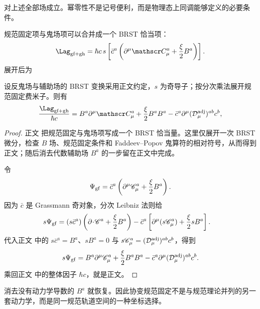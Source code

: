 对上述全部场成立。幂零性不是记号便利，而是物理态上同调能够定义的必要条件。

规范固定项与鬼场项可以合并成一个 BRST 恰当项：
\begin{equation}
 {
 \Lag_{\rm gf+gh}
 =\hbar c\,s\left[
 \bar c^a\left(\partial^\mu\mathscr C_\mu^a+\frac\xi2B^a\right)
 \right].}
 \label{eq:brst-exact-gf-dp11}
\end{equation}
展开后为


\begin{proposition}
设反鬼场与辅助场的 BRST 变换采用正文约定，$s$ 为奇导子；按分次乘法展开规范固定费米子。则有
\begin{equation}
 \frac{\Lag_{\rm gf+gh}}{\hbar c}
 =B^a\partial^\mu\mathscr C_\mu^a
 +\frac\xi2B^aB^a
 -\bar c^a\partial^\mu(\mathcal D_\mu^{\rm adj})^{ab}c^b,
\label{eq:brst-gf-expanded-dp11}
\end{equation}
\end{proposition}
\begin{proof}
正文 把规范固定与鬼场项写成一个 BRST 恰当量。这里仅展开一次 BRST 微分，检查 $B$ 场、规范固定条件和 Faddeev--Popov 鬼算符的相对符号，从而得到正文；随后消去代数辅助场 $B^a$ 的一步留在正文中完成。

令
\begin{equation*}
 \Psi_{\rm gf}
 =\bar c^a\left(\partial^\mu\mathscr C_\mu^a+\frac\xi2B^a\right).
\end{equation*}
因为 $\bar c$ 是 Grassmann 奇对象，分次 Leibniz 法则给
\begin{align*}
 s\Psi_{\rm gf}
 ={}&(s\bar c^a)
 \left(\partial\!\cdot\!\mathscr C^a+\frac\xi2B^a\right)
 -\bar c^a\left[
 \partial^\mu(s\mathscr C_\mu^a)+\frac\xi2sB^a
 \right].
\end{align*}
代入正文 中的
$s\bar c^a=B^a$、$sB^a=0$ 与
$s\mathscr C_\mu^a=(\mathcal D_\mu^{\rm adj})^{ab}c^b$，得到
\begin{equation*}
 s\Psi_{\rm gf}
 =B^a\partial^\mu\mathscr C_\mu^a
 +\frac\xi2B^aB^a
 -\bar c^a\partial^\mu(\mathcal D_\mu^{\rm adj})^{ab}c^b.
\end{equation*}
乘回正文 中的整体因子 $\hbar c$，就是正文。
\end{proof}

消去没有动力学导数的 $B^a$ 就恢复。因此协变规范固定不是与规范理论并列的另一套动力学，而是同一规范轨道空间的一种坐标选择。

